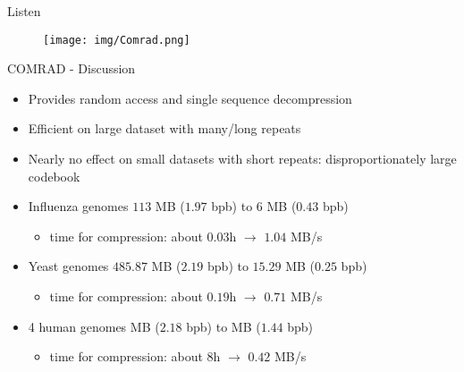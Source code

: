 \documentclass[aspectratio=1610]{beamer}
\begin{document}
\begin{frame}[plain]{Listen}
\vfill
\begin{center}
  \begin{figure}
    \texttt{[image: img/Comrad.png]}
  \end{figure}
\end{center}
\vfill
\end{frame}

\begin{frame}{COMRAD -  Discussion}
  \begin{itemize}
    \item Provides random access and single sequence decompression
    \item Efficient on large dataset with many/long repeats
    \item Nearly no effect on small datasets with short repeats: disproportionately large codebook
  \end{itemize}
  \begin{itemize}
    \item Influenza genomes $113$ MB ($1.97$ bpb) to $6$ MB ($0.43$ bpb)
    \begin{itemize}
      \item time for compression: about $0.03$h $\rightarrow$ $1.04$ MB/s
    \end{itemize}
    \item Yeast genomes $485.87$ MB ($2.19$ bpb) to $15.29$ MB ($0.25$ bpb)
    \begin{itemize}
      \item time for compression: about $0.19$h $\rightarrow$ $0.71$ MB/s
    \end{itemize}
    \item 4 human genomes  MB ($2.18$ bpb) to MB ($1.44$ bpb)
    \begin{itemize}
      \item time for compression: about $8$h $\rightarrow$ $0.42$ MB/s
    \end{itemize}
  \end{itemize}
\end{frame}
\end{document}
